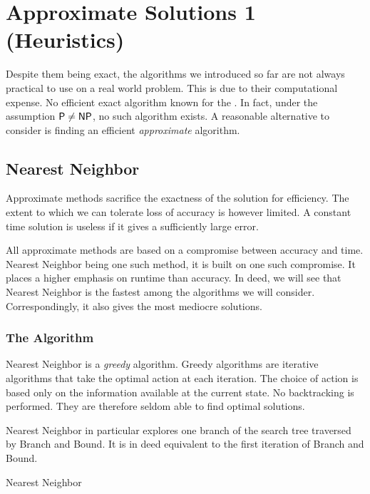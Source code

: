 \chapter{Approximate Solutions 1 (Heuristics)}

Despite them being exact, the algorithms we introduced so far are not always practical to use on a real world problem. This is due to their computational expense. No efficient exact algorithm known for the \TSP. In fact, under the assumption \(\textsf{P}\neq\textsf{NP}\), no such algorithm exists. A reasonable alternative to consider is finding an efficient \emph{approximate} algorithm.

\section{Nearest Neighbor}

    Approximate methods sacrifice the exactness of the solution for efficiency. The extent to which we can tolerate loss of accuracy is however limited. A constant time solution is useless if it gives a sufficiently large error. 
    
    All approximate methods are based on a compromise between accuracy and time. Nearest Neighbor being one such method, it is built on one such compromise. It places a higher emphasis on runtime than accuracy. In deed, we will see that Nearest Neighbor is the fastest among the algorithms we will consider. Correspondingly, it also gives the most mediocre solutions.

    \subsection{The Algorithm}

    Nearest Neighbor is a \emph{greedy} algorithm. Greedy algorithms are iterative algorithms that take the optimal action at each iteration. The choice of action is based only on the information available at the current state. No backtracking is performed. They are therefore seldom able to find optimal solutions.

    Nearest Neighbor in particular explores one branch of the search tree traversed by Branch and Bound. It is in deed equivalent to the first iteration of Branch and Bound. 
    \let\textnormal\ttfamily
        \begin{algorithm}
        \caption{Nearest Neighbor}
        \label{algo:nearest-neighbor}
            \DontPrintSemicolon
             
    \end{algorithm}

